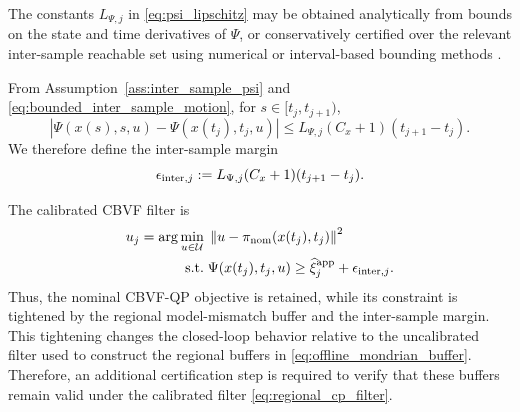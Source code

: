 \documentclass[letterpaper,10pt,conference]{ieeeconf}
\newcommand{\xv}{x}
\newcommand{\uv}{u}
\newcommand{\Uv}{\mathcal{U}}
\newcommand{\norm}[1]{\left\lVert #1 \right\rVert}
\begin{document}
The constants $L_{\Psi,j}$ in \eqref{eq:psi_lipschitz} may be obtained
analytically from bounds on the state and time derivatives of $\Psi$, or
conservatively certified over the relevant inter-sample reachable set using
numerical or interval-based bounding methods
\cite{breeden2022sampled,singletary2020sampled,zhang2022interval}.

From Assumption~\ref{ass:inter_sample_psi} and
\eqref{eq:bounded_inter_sample_motion}, for
$s\in[t_j,t_{j+1})$,
\begin{equation}
\left|
\Psi(\xv(s),s,\uv)-\Psi(\xv(t_j),t_j,\uv)
\right|
\leq
L_{\Psi,j}(C_x+1)(t_{j+1}-t_j).
\label{eq:psi_inter_sample_bound}
\end{equation}
We therefore define the inter-sample margin
\begin{equation}
\epsilon_{{\rm inter},j}
:=
L_{\Psi,j}(C_x+1) (t_{j+1}-t_j) .
\label{eq:inter_sample_margin}
\end{equation}

The calibrated CBVF filter is
\begin{equation}
\begin{aligned}
u_j=\arg\min_{\uv\in\Uv}\;&
\norm{\uv-\pi_{\mathrm{nom}}(\xv(t_j),t_j)}^2 \\
\mathrm{s.t.}\;&
\Psi(\xv(t_j),t_j,\uv)
\geq
\widehat\xi^{\rm app}_{j}
+\epsilon_{{\rm inter},j}.
\end{aligned}
\label{eq:regional_cp_filter}
\end{equation}
Thus, the nominal CBVF-QP objective is retained, while its constraint is tightened by the regional model-mismatch buffer and the inter-sample margin. This tightening changes the closed-loop behavior relative to the uncalibrated filter used to construct the regional buffers in \eqref{eq:offline_mondrian_buffer}. Therefore, an additional certification step is required to verify that these buffers remain valid under the calibrated filter \eqref{eq:regional_cp_filter}.
\end{document}
